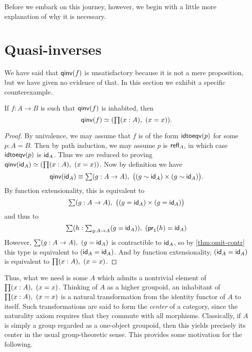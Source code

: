 Before we embark on this journey, however, we begin with a little more explanation of why it is necessary.

\section{Quasi-inverses}
\label{sec:quasi-inverses}

We have said that $\qinv(f)$ is unsatisfactory because it is not a mere proposition, but we have given no evidence of that.
In this section we exhibit a specific counterexample.

\begin{lem}\label{lem:qinv-autohtpy}
  If $f:A\to B$ is such that $\qinv (f)$ is inhabited, then
  \[\eqv{\qinv(f)}{(\prd{x:A}(x=x))}.\]
\end{lem}
\begin{proof}
  By univalence, we may assume that $f$ is of the form $\idtoeqv(p)$ for some $p:A=B$.
  Then by path induction, we may assume $p$ is $\refl{A}$, in which case $\idtoeqv(p)$ is $\idfunc[A]$.
  Thus we are reduced to proving $\eqv{\qinv(\idfunc[A])}{(\prd{x:A}(x=x))}$.
  Now by definition we have
  \[ \qinv(\idfunc[A]) \jdeq
  \sm{g:A\to A} \big((g \htpy \idfunc[A]) \times (g \htpy \idfunc[A])\big).
  \]
  By function extensionality, this is equivalent to
  \[ \sm{g:A\to A} \big((g = \idfunc[A]) \times (g = \idfunc[A])\big)
  \]
  and thus to
  \[ \sm{h:\textstyle\sum_{g:A\to A} (g = \idfunc[A])} (\proj1(h) = \idfunc[A])
  \]
  However, $\sm{g:A\to A} (g = \idfunc[A])$ is contractible to $\idfunc[A]$, so by \autoref{thm:omit-contr} this type is equivalent to $(\idfunc[A] = \idfunc[A])$.
  And by function extensionality, $(\idfunc[A] = \idfunc[A])$ is equivalent to $\prd{x:A}(x=x)$.
\end{proof}

Thus, what we need is some $A$ which admits a nontrivial element of $\prd{x:A}(x=x)$.
Thinking of $A$ as a higher groupoid, an inhabitant of $\prd{x:A}(x=x)$ is a natural transformation from the identity functor of $A$ to itself.
Such transformations are said to form the \emph{center} of a category, since the naturality axiom requires that they commute with all morphisms.
Classically, if $A$ is simply a group regarded as a one-object groupoid, then this yields precisely its center in the usual group-theoretic sense.
This provides some motivation for the following.

